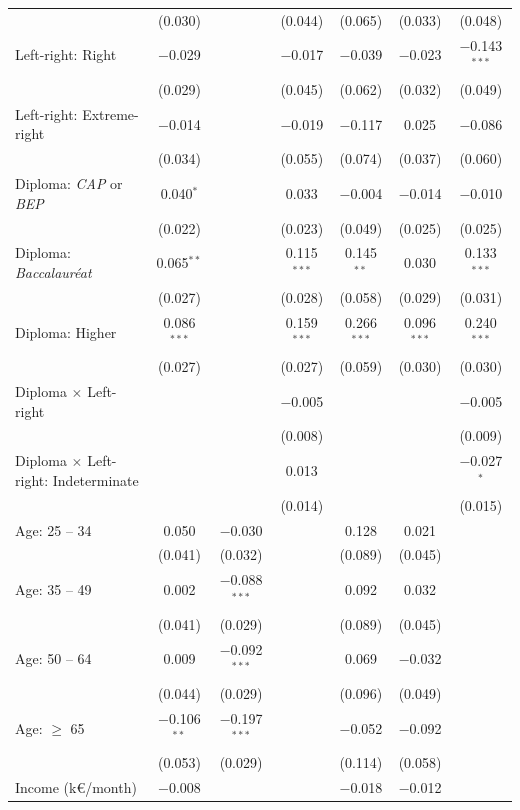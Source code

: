 \documentclass[english,5p,authoryear]{elsarticle}
\begin{document}
\begin{table}[!htbp]
{\begin{tabular}{@{\extracolsep{5pt}}lcccccc}
  & (0.030) &  & (0.044) & (0.065) & (0.033) & (0.048) \\ 
  Left-right: Right & $-$0.029 &  & $-$0.017 & $-$0.039 & $-$0.023 & $-$0.143$^{***}$ \\ 
  & (0.029) &  & (0.045) & (0.062) & (0.032) & (0.049) \\ 
  Left-right: Extreme-right & $-$0.014 &  & $-$0.019 & $-$0.117 & 0.025 & $-$0.086 \\ 
  & (0.034) &  & (0.055) & (0.074) & (0.037) & (0.060) \\ 
  Diploma: \textit{CAP} or \textit{BEP} & 0.040$^{*}$ &  & 0.033 & $-$0.004 & $-$0.014 & $-$0.010 \\ 
  & (0.022) &  & (0.023) & (0.049) & (0.025) & (0.025) \\ 
  Diploma: \textit{Baccalauréat} & 0.065$^{**}$ &  & 0.115$^{***}$ & 0.145$^{**}$ & 0.030 & 0.133$^{***}$ \\ 
  & (0.027) &  & (0.028) & (0.058) & (0.029) & (0.031) \\ 
  Diploma: Higher & 0.086$^{***}$ &  & 0.159$^{***}$ & 0.266$^{***}$ & 0.096$^{***}$ & 0.240$^{***}$ \\ 
  & (0.027) &  & (0.027) & (0.059) & (0.030) & (0.030) \\ 
  Diploma $\times$ Left-right &  &  & $-$0.005 &  &  & $-$0.005 \\ 
  &  &  & (0.008) &  &  & (0.009) \\ 
  Diploma $\times$ Left-right: Indeterminate &  &  & 0.013 &  &  & $-$0.027$^{*}$ \\ 
  &  &  & (0.014) &  &  & (0.015) \\ 
  Age: 25 -- 34 & 0.050 & $-$0.030 &  & 0.128 & 0.021 &  \\ 
  & (0.041) & (0.032) &  & (0.089) & (0.045) &  \\ 
  Age: 35 -- 49 & 0.002 & $-$0.088$^{***}$ &  & 0.092 & 0.032 &  \\ 
  & (0.041) & (0.029) &  & (0.089) & (0.045) &  \\ 
  Age: 50 -- 64 & 0.009 & $-$0.092$^{***}$ &  & 0.069 & $-$0.032 &  \\ 
  & (0.044) & (0.029) &  & (0.096) & (0.049) &  \\ 
  Age: $\geq$ 65 & $-$0.106$^{**}$ & $-$0.197$^{***}$ &  & $-$0.052 & $-$0.092 &  \\ 
  & (0.053) & (0.029) &  & (0.114) & (0.058) &  \\ 
  Income (k\euro{}/month) & $-$0.008 &  &  & $-$0.018 & $-$0.012 &  \\ 

\end{tabular}}
\end{table}
\end{document}
